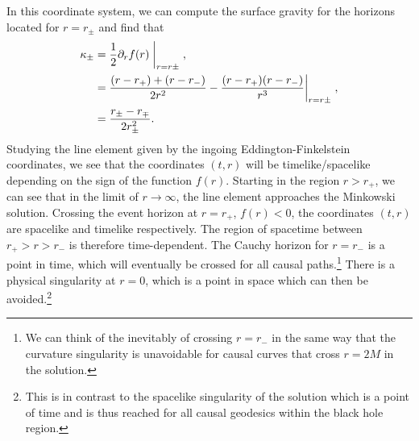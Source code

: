 In this coordinate system, we can compute the surface gravity  for the horizons located for $r = r_\pm$ and find that
\begin{equation}
\label{eq:rnsurfacegravity}
\begin{aligned}
		\kappa_\pm &= \frac{1}{2} \partial_r f(r) \; \bigg|_{r = r\pm} \;, \\
	&= \frac{(r - r_+) + (r - r_-)}{2r^2} - \frac{(r - r_+)(r - r_-)}{r^3 } \bigg|_{r = r\pm} \; ,\\
	&= \frac{r_\pm - r_\mp}{2r_\pm^2}.
\end{aligned}
\end{equation}
Studying the line element given by the ingoing Eddington-Finkelstein coordinates, we see that the coordinates $(t,r)$ will be timelike/spacelike depending on the sign of the function $f(r)$. Starting in the region $r > r_+$, we can see that in the limit of $r \to \infty$, the line element  approaches the Minkowski solution. Crossing the event horizon at $r = r_+$, $f(r) < 0$, the coordinates $(t,r)$ are spacelike and timelike respectively. The region of spacetime between $r_+ > r > r_-$ is therefore time-dependent. The Cauchy horizon for $r = r_-$ is a point in time, which will eventually be crossed for all causal paths.\footnote{We can think of the inevitably of crossing $r = r_-$ in the same way that the curvature singularity is unavoidable for causal curves that cross $r = 2M$ in the \sch solution.} There is a physical singularity at $r = 0$, which is a point in space which can then be avoided.\footnote{This is in contrast to the spacelike singularity of the \sch solution which is a point of time and is thus reached for all causal geodesics within the black hole region.}

